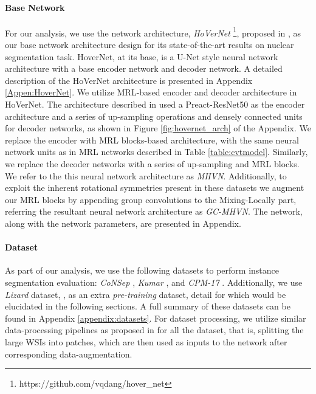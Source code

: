 \documentclass{article}
\begin{document}
\paragraph{Base Network}
For our analysis, we use the network architecture, \textit{HoVerNet} \footnote{https://github.com/vqdang/hover\_net}, proposed in \cite{DBLP:journals/corr/hovernet}, as our base network architecture design for its state-of-the-art results on nuclear segmentation task. HoverNet, at its base, is a U-Net \cite{UNet} style neural network architecture with a base encoder network and decoder network. A detailed description of the HoVerNet architecture is presented in Appendix \ref{Appen:HoverNet}. We utilize MRL-based encoder and decoder architecture in HoVerNet. The architecture described in \cite{DBLP:journals/corr/hovernet} used a Preact-ResNet50 \cite{preactrestnet} as the encoder architecture and a series of up-sampling operations and densely connected units \cite{densecnn} for decoder networks, as shown in Figure \ref{fig:hovernet_arch} of the Appendix. We replace the encoder with MRL blocks-based architecture, with the same neural network units as in MRL networks described in Table \ref{table:cvtmodel}. Similarly, we replace the decoder networks with a series of up-sampling and MRL blocks. We refer to the this neural network architecture as \textit{MHVN}. Additionally, to exploit the inherent rotational symmetries present in these datasets \cite{DSF-CNN} we augment our MRL blocks by appending group convolutions \cite{DBLP:journals/corr/CohenW16} to the Mixing-Locally part, referring the resultant neural network architecture as \textit{GC-MHVN}. The network, along with the network parameters, are presented in Appendix.
\vspace{-4mm}
\paragraph{Dataset} As part of our analysis, we use the following datasets to perform instance segmentation evaluation: \textit{CoNSep} \cite{DBLP:journals/corr/hovernet}, \textit{Kumar} \cite{kumar}, and \textit{CPM-17} \cite{CPM17}. Additionally, we use \textit{Lizard} dataset, \cite{graham2021lizard}, as an extra \textit{pre-training} dataset, detail for which would be elucidated in the following sections. A full summary of these datasets can be found in Appendix \ref{appendix:datasets}. For dataset processing, we utilize similar data-processing pipelines as proposed in \cite{DBLP:journals/corr/hovernet} for all the dataset, that is, splitting the large WSIs into patches, which are then used as inputs to the network after corresponding data-augmentation. 
\vspace{-4mm}
\end{document}
